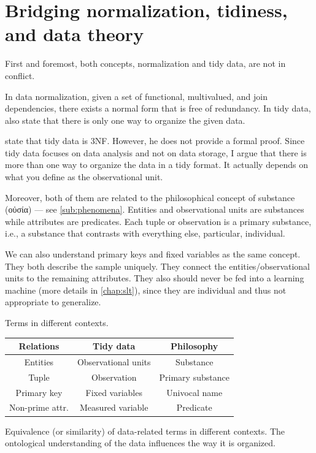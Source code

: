 \section{Bridging normalization, tidiness, and data theory}
\label{sub:bridge}

First and foremost, both concepts, normalization and tidy data, are not in conflict.

In data normalization, given a set of functional, multivalued, and join dependencies, there
exists a normal form that is free of redundancy.  In tidy data,
\textcite{Wickham2023} also state that there is only one way to organize the given data.

\textcite{Wickham2014} state that tidy data is 3NF.  However, he does not provide a
formal proof.  Since tidy data focuses on data analysis and not on data storage, I argue
that there is more than one way to organize the data in a tidy format.  It actually
depends on what you define as the observational unit.

Moreover, both of them are related to the philosophical concept of substance (οὐσία) ---
see \cref{sub:phenomena}.
Entities and observational units are substances while attributes are predicates.
Each tuple or observation is a primary substance, i.e., a substance that contrasts with
everything else, particular, individual.

We can also understand primary keys and fixed variables as the same concept.  They both
describe the sample uniquely.  They connect the entities/observational
units to the remaining attributes.  They also should never be fed into a learning
machine (more details in \cref{chap:slt}), since they are individual and thus not
appropriate to generalize.

\begin{tablebox}[label=fig:bridge]{Terms in different contexts.}
  \centering
  \begin{tabular}{ccc}
    \toprule
    \textbf{Relations} & \textbf{Tidy data} & \textbf{Philosophy} \\
    \midrule
    Entities & Observational units & Substance \\
    Tuple & Observation & Primary substance \\
    Primary key & Fixed variables & Univocal name \\
    Non-prime attr. & Measured variable & Predicate \\
    \bottomrule
  \end{tabular}
  \tcblower
  Equivalence (or similarity) of data-related terms in different contexts.
  The ontological understanding of the data influences the way it is organized.
\end{tablebox}

